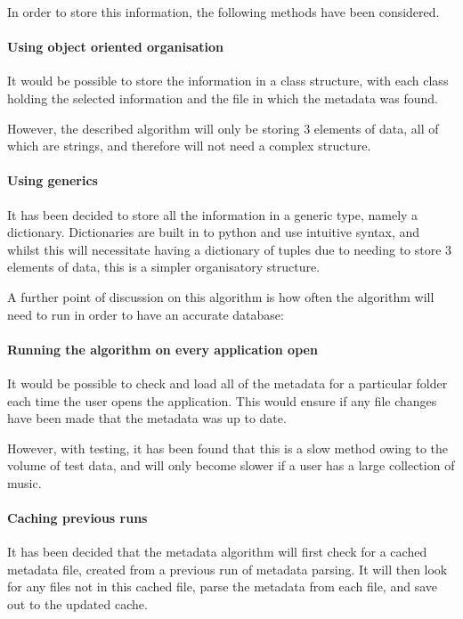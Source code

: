 In order to store this information, the following methods have been considered.

\paragraph{Using object oriented organisation}
It would be possible to store the information in a class structure, with each class holding the selected information and the file in which the metadata was found.

However, the described algorithm will only be storing 3 elements of data, all of which are strings, and therefore will not need a complex structure.

\paragraph{Using generics}
It has been decided to store all the information in a generic type, namely a dictionary. Dictionaries are built in to python and use intuitive syntax, and whilst this will necessitate having a dictionary of tuples due to needing to store 3 elements of data, this is a simpler organisatory structure.

A further point of discussion on this algorithm is how often the algorithm will need to run in order to have an accurate database:

\paragraph{Running the algorithm on every application open}
It would be possible to check and load all of the metadata for a particular folder each time the user opens the application. This would ensure if any file changes have been made that the metadata was up to date.

However, with testing, it has been found that this is a slow method owing to the volume of test data, and will only become slower if a user has a large collection of music. 

\paragraph{Caching previous runs}
It has been decided that the metadata algorithm will first check for a cached metadata file, created from a previous run of metadata parsing. It will then look for any files not in this cached file, parse the metadata from each file, and save out to the updated cache.

